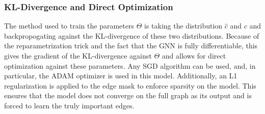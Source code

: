 \subsubsection{KL-Divergence and Direct Optimization}
The method used to train the parameters $\Theta$ is taking the distribution $\hat{c}$ and $c$ and backpropogating against the KL-divergence of these two distributions. Because of the reparametrization trick and the fact that the GNN is fully differentiable, this gives the gradient of the KL-divergence against $\Theta$ and allows for direct optimization against these parameters. Any SGD algorithm can be used, and, in particular, the ADAM optimizer \cite{kingma_adam_2017} is used in this model. Additionally, an L1 regularization is applied to the edge mask to enforce sparsity on the model. This ensures that the model does not converge on the full graph as its output and is forced to learn the truly important edges. 

\newpage

